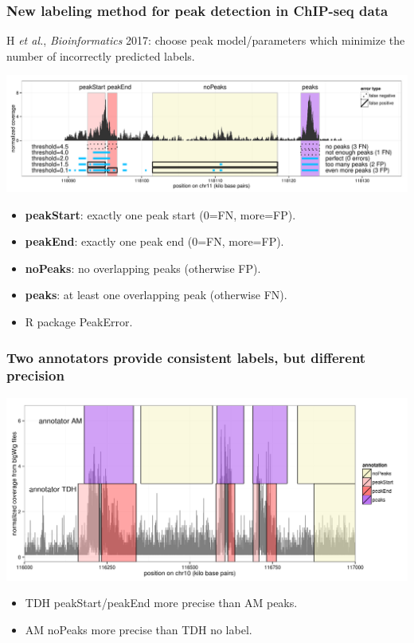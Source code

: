 \documentclass{beamer}
\begin{document}
\begin{frame}
  \frametitle{New labeling method for peak detection in ChIP-seq data}

  H {\it et al.}, {\it Bioinformatics} 2017: choose peak model/parameters
  which minimize the number of incorrectly predicted labels.

  \includegraphics[width=\textwidth]{figure-PeakError.pdf}
  \begin{itemize}
  \item \textbf{peakStart}: exactly one peak start (0=FN, more=FP).
  \item \textbf{peakEnd}: exactly one peak end (0=FN, more=FP).
  \item \textbf{noPeaks}: no overlapping peaks (otherwise FP).
  \item \textbf{peaks}: at least one overlapping peak (otherwise FN).
  \item R package PeakError.
  \end{itemize}
\end{frame}

\begin{frame}
  \frametitle{Two annotators provide consistent labels, but different
    precision}
  \includegraphics[width=1.1\textwidth]{screenshot-several-annotators}

  \begin{itemize}
  \item TDH peakStart/peakEnd more precise than AM peaks.
  \item AM noPeaks more precise than TDH no label.
  \end{itemize}
\end{frame}
\end{document}
